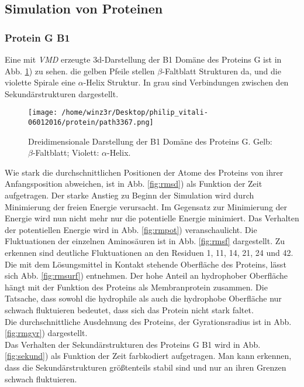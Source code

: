 \subsection{Simulation von Proteinen}
\subsubsection{Protein G B1}
Eine mit \emph{VMD} erzeugte 3d-Darstellung der B1 Domäne des Proteins G ist in Abb. \ref{fig:3dpgb}) zu sehen.
die gelben Pfeile stellen $\beta$-Faltblatt Strukturen da, und die violette Spirale eine $\alpha$-Helix Struktur. In grau sind Verbindungen zwischen den Sekundärstrukturen dargestellt.
\begin{figure}
\centering
\texttt{[image: /home/winz3r/Desktop/philip\_vitali-06012016/protein/path3367.png]}\caption{Dreidimensionale Darstellung der B1 Domäne des Proteins G. Gelb: $\beta$-Faltblatt; Violett: $\alpha$-Helix.}\label{fig:3dpgb}
\end{figure}
\noindent
Wie stark die durchschnittlichen Positionen der Atome des Proteins von ihrer Anfangsposition abweichen, ist in Abb. \ref{fig:rmsd}) als Funktion der Zeit aufgetragen. Der starke Anstieg zu Beginn der Simulation wird durch Minimierung der freien Energie verursacht.
Im Gegensatz zur Minimierung der Energie wird nun nicht mehr nur die potentielle Energie minimiert.
Das Verhalten der potentiellen Energie wird in Abb. \ref{fig:rmpot}) veranschaulicht.
Die Fluktuationen der einzelnen Aminosäuren ist in Abb. \ref{fig:rmsf} dargestellt. Zu erkennen sind deutliche Fluktuationen an den Residuen
1, 11, 14, 21, 24 und 42.
\\ \noindent
Die mit dem Lösungsmittel in Kontakt stehende Oberfläche des Proteins, lässt sich Abb. \ref{fig:rmsurf}) entnehmen. Der hohe Anteil an hydrophober Oberfläche hängt mit der Funktion des Proteins als Membranprotein zusammen. Die Tatsache, dass sowohl die hydrophile als auch die hydrophobe Oberfläche nur schwach fluktuieren bedeutet, dass sich das Protein nicht stark faltet.
\\ \noindent
Die durchschnittliche Ausdehnung des Proteins, der Gyrationsradius ist in Abb. \ref{fig:rmgyr}) dargestellt.
\\ \noindent
Das Verhalten der Sekundärstrukturen des Proteins G B1 wird in Abb. \ref{fig:sekund}) als Funktion der Zeit farbkodiert aufgetragen. Man kann erkennen, dass die Sekundärstrukturen
größtenteils stabil sind und nur an ihren Grenzen schwach fluktuieren.

